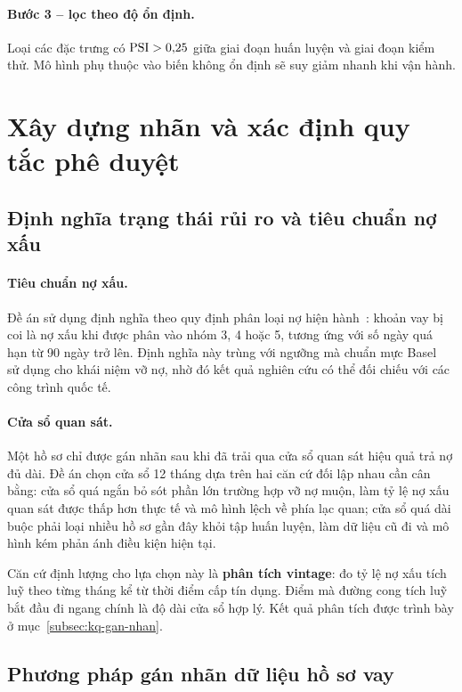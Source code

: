 \paragraph{Bước 3 -- lọc theo độ ổn định.} Loại các đặc trưng có $\mathrm{PSI} > 0{,}25$
giữa giai đoạn huấn luyện và giai đoạn kiểm thử. Mô hình phụ thuộc vào biến không
ổn định sẽ suy giảm nhanh khi vận hành.

\section{Xây dựng nhãn và xác định quy tắc phê duyệt}
\label{sec:xay-dung-nhan}

\subsection{Định nghĩa trạng thái rủi ro và tiêu chuẩn nợ xấu}
\label{subsec:dinh-nghia-nhan}

\paragraph{Tiêu chuẩn nợ xấu.} Đề án sử dụng định nghĩa theo quy định phân loại
nợ hiện hành~\cite{tt11}: khoản vay bị coi là nợ xấu khi được phân vào nhóm 3, 4
hoặc 5, tương ứng với số ngày quá hạn từ 90 ngày trở lên. Định nghĩa này trùng
với ngưỡng mà chuẩn mực Basel~\cite{bcbs2006} sử dụng cho khái niệm vỡ nợ, nhờ đó
kết quả nghiên cứu có thể đối chiếu với các công trình quốc tế.

\paragraph{Cửa sổ quan sát.} Một hồ sơ chỉ được gán nhãn sau khi đã trải qua cửa
sổ quan sát hiệu quả trả nợ đủ dài. Đề án chọn cửa sổ 12 tháng dựa trên hai căn
cứ đối lập nhau cần cân bằng: cửa sổ quá ngắn bỏ sót phần lớn trường hợp vỡ nợ
muộn, làm tỷ lệ nợ xấu quan sát được thấp hơn thực tế và mô hình lệch về phía lạc
quan; cửa sổ quá dài buộc phải loại nhiều hồ sơ gần đây khỏi tập huấn luyện, làm
dữ liệu cũ đi và mô hình kém phản ánh điều kiện hiện tại.

Căn cứ định lượng cho lựa chọn này là \textbf{phân tích vintage}: đo tỷ lệ nợ xấu
tích luỹ theo từng tháng kể từ thời điểm cấp tín dụng. Điểm mà đường cong tích
luỹ bắt đầu đi ngang chính là độ dài cửa sổ hợp lý. Kết quả phân tích được trình
bày ở mục~\ref{subsec:kq-gan-nhan}.

\subsection{Phương pháp gán nhãn dữ liệu hồ sơ vay}
\label{subsec:phuong-phap-gan-nhan}

